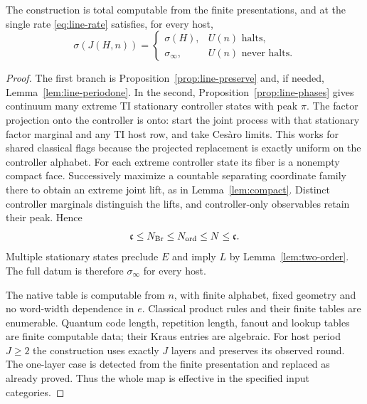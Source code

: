 \begin{proposition}\label{prop:line-branches}
The construction is total computable from the finite presentations,
and at the single rate \eqref{eq:line-rate} satisfies, for every host,
\[
 \sigma(J(H,n))=
 \begin{cases}
 \sigma(H),& U(n)\text{ halts},\\
 \sigma_\infty,& U(n)\text{ never halts}.
 \end{cases}
\]
\end{proposition}
\begin{proof}
The first branch is Proposition~\ref{prop:line-preserve} and, if
needed, Lemma~\ref{lem:line-periodone}. In the second,
Proposition~\ref{prop:line-phases} gives continuum many extreme TI
stationary controller states with peak $\pi$.
The factor projection onto the controller is onto: start the joint
process with that stationary factor marginal and any TI host row,
and take Ces\`aro limits. This works for shared classical flags
because the projected replacement is exactly uniform on the
controller alphabet. For each extreme controller state its fiber
is a nonempty compact face. Successively maximize a countable
separating coordinate family there to obtain an extreme joint lift,
as in Lemma~\ref{lem:compact}. Distinct controller marginals distinguish
the lifts, and controller-only observables retain their peak.
Hence
\[
 \mathfrak c\le N_{\mathrm{Br}}\le N_{\mathrm{ord}}\le N\le\mathfrak c.
\]
Multiple stationary states preclude $E$ and imply $L$ by
Lemma~\ref{lem:two-order}. The full datum is therefore $\sigma_\infty$
for every host.

The native table is computable from $n$, with finite alphabet,
fixed geometry and no word-width dependence in $e$.
Classical product rules and their finite tables are enumerable.
Quantum code length, repetition length, fanout and lookup tables
are finite computable data; their Kraus entries are algebraic.
For host period $J\ge2$ the construction uses exactly $J$ layers
and preserves its observed round. The one-layer case is detected
from the finite presentation and replaced as already proved.
Thus the whole map is effective in the specified input categories.
\end{proof}

